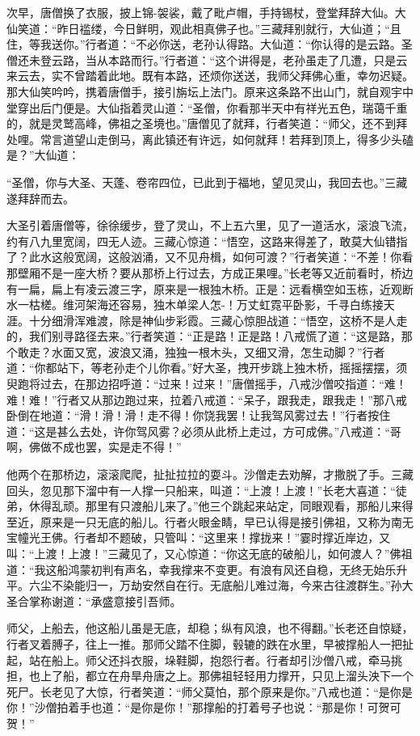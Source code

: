 \documentclass[12pt,UTF8]{ctexbook}
\begin{document}
{	次早，唐僧换了衣服，披上锦-袈裟，戴了毗卢帽，手持锡杖，登堂拜辞大仙。大仙笑道：“昨日褴缕，今日鲜明，观此相真佛子也。”三藏拜别就行，大仙道；“且住，等我送你。”行者道：“不必你送，老孙认得路。大仙道：“你认得的是云路。圣僧还未登云路，当从本路而行。”行者道：“这个讲得是，老孙虽走了几遭，只是云来云去，实不曾踏着此地。既有本路，还烦你送送，我师父拜佛心重，幸勿迟疑。那大仙笑吟吟，携着唐僧手，接引旃坛上法门。原来这条路不出山门，就自观宇中堂穿出后门便是。大仙指着灵山道：“圣僧，你看那半天中有祥光五色，瑞蔼千重的，就是灵鹫高峰，佛祖之圣境也。”唐僧见了就拜，行者笑道：“师父，还不到拜处哩。常言道望山走倒马，离此镇还有许远，如何就拜！若拜到顶上，得多少头磕是？”大仙道：
	
	“圣僧，你与大圣、天蓬、卷帘四位，已此到于福地，望见灵山，我回去也。”三藏遂拜辞而去。
	
	大圣引着唐僧等，徐徐缓步，登了灵山，不上五六里，见了一道活水，滚浪飞流，约有八九里宽阔，四无人迹。三藏心惊道：“悟空，这路来得差了，敢莫大仙错指了？此水这般宽阔，这般汹涌，又不见舟楫，如何可渡？”行者笑道：“不差！你看那壁厢不是一座大桥？要从那桥上行过去，方成正果哩。”长老等又近前看时，桥边有一扁，扁上有凌云渡三字，原来是一根独木桥。正是：远看横空如玉栋，近观断水一枯槎。维河架海还容易，独木单梁人怎-！万丈虹霓平卧影，千寻白练接天涯。十分细滑浑难渡，除是神仙步彩霞。三藏心惊胆战道：“悟空，这桥不是人走的，我们别寻路径去来。”行者笑道：“正是路！正是路！八戒慌了道：“这是路，那个敢走？水面又宽，波浪又涌，独独一根木头，又细又滑，怎生动脚？”行者道：“你都站下，等老孙走个儿你看。”好大圣，拽开步跳上独木桥，摇摇摆摆，须臾跑将过去，在那边招呼道：“过来！过来！”唐僧摇手，八戒沙僧咬指道：“难！难！难！”行者又从那边跑过来，拉着八戒道：“呆子，跟我走，跟我走！”那八戒卧倒在地道：“滑！滑！滑！走不得！你饶我罢！让我驾风雾过去！”行者按住道：“这是甚么去处，许你驾风雾？必须从此桥上走过，方可成佛。”八戒道：“哥啊，佛做不成也罢，实是走不得！”
	
	他两个在那桥边，滚滚爬爬，扯扯拉拉的耍斗。沙僧走去劝解，才撒脱了手。三藏回头，忽见那下溜中有一人撑一只船来，叫道：“上渡！上渡！”长老大喜道：“徒弟，休得乱顽。那里有只渡船儿来了。”他三个跳起来站定，同眼观看，那船儿来得至近，原来是一只无底的船儿。行者火眼金睛，早已认得是接引佛祖，又称为南无宝幢光王佛。行者却不题破，只管叫：“这里来！撑拢来！”霎时撑近岸边，又叫：“上渡！上渡！”三藏见了，又心惊道：“你这无底的破船儿，如何渡人？”佛祖道：“我这船鸿蒙初判有声名，幸我撑来不变更。有浪有风还自稳，无终无始乐升平。六尘不染能归一，万劫安然自在行。无底船儿难过海，今来古往渡群生。”孙大圣合掌称谢道：“承盛意接引吾师。
	
	师父，上船去，他这船儿虽是无底，却稳；纵有风浪，也不得翻。”长老还自惊疑，行者叉着膊子，往上一推。那师父踏不住脚，毂辘的跌在水里，早被撑船人一把扯起，站在船上。师父还抖衣服，垛鞋脚，抱怨行者。行者却引沙僧八戒，牵马挑担，也上了船，都立在舟旱舟唐之上。那佛祖轻轻用力撑开，只见上溜头泱下一个死尸。长老见了大惊，行者笑道：“师父莫怕，那个原来是你。”八戒也道：“是你是你！”沙僧拍着手也道：“是你是你！”那撑船的打着号子也说：“那是你！可贺可贺！”
	
}
\end{document}
